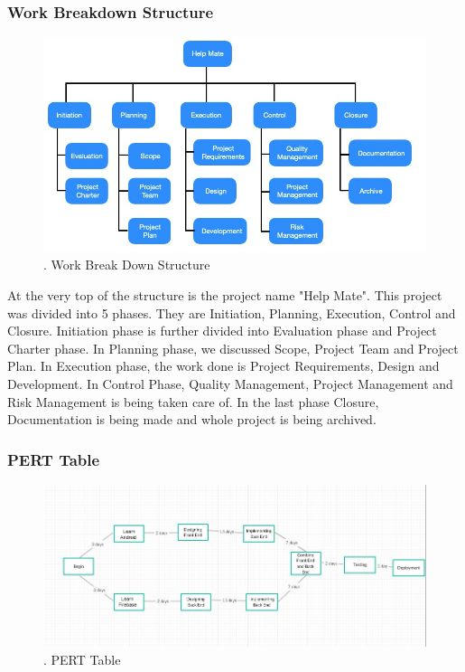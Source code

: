 \documentclass{article}
\begin{document}
\begin{flushleft}
\newpage
            \subsubsection{Work Breakdown Structure}
            \begin{figure}[!ht]
              
              \includegraphics[width=12cm]{WBS.jpg}
              \renewcommand{\thefigure}{ \thesubsection.\arabic{figure}}
              \caption{ .  Work Break Down Structure}
            \end{figure}
            \bigskip
            At the very top of the structure is the project name "Help Mate". This project was divided into 5 phases. They are Initiation, Planning, Execution, Control and Closure. Initiation phase is further divided into Evaluation phase and Project Charter phase. In Planning phase, we discussed Scope, Project Team and Project Plan. In Execution phase, the work done is Project Requirements, Design and Development. In Control Phase, Quality Management, Project Management and Risk Management is being taken care of. In the last phase Closure, Documentation is being made and whole project is being archived.
            
            
            
            
            
            \newpage
            
            \subsubsection{PERT Table}
            \begin{figure}[!ht]
              
              \includegraphics[width=12cm]{Pert.JPG}
              \renewcommand{\thefigure}{ \thesubsection.\arabic{figure}}
              \caption{ .  PERT Table}
            \end{figure}
            


\end{flushleft}
\end{document}
